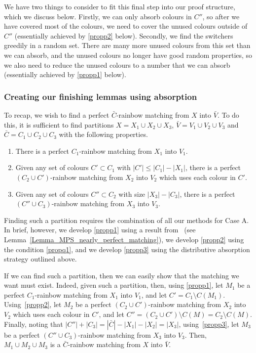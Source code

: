 We have two things to consider to fit this final step into our proof structure, which we discuss below. Firstly, we can only absorb colours in $C''$, so after we have covered most of the colours, we need to cover the unused colours outside of $C''$ (essentially achieved by \ref{propp2} below). Secondly, we find the switchers greedily in a random set. There are many more unused colours from this set than we can absorb, and the unused colours no longer have good random properties, so we also need to reduce the unused colours to a number that we can absorb (essentially achieved by \ref{propp1} below).


\subsubsection*{Creating our finishing lemmas using absorption}
To recap, we wish to find a perfect $\bar{C}$-rainbow matching from $X$ into $\bar{V}$. To do this, it is sufficient to find partitions $X=X_1\cup X_2\cup X_3$, $\bar{V}=V_1\cup V_2\cup V_3$ and $\bar{C}=C_1\cup C_2\cup C_3$ with the following properties.
\begin{enumerate}[label = {\bfseries \Alph{propcounter}\arabic{enumi}}]
\item There is a perfect $C_1$-rainbow matching from $X_1$ into $V_1$. \label{propp1}
\item Given any set of colours $C'\subset C_1$ with $|C'|\leq |C_1|-|X_1|$, there is a perfect $(C_2\cup C')$-rainbow matching from $X_2$ into $V_2$ which uses each colour in $C'$.\label{propp2}
\item Given any set of colours $C''\subset C_2$ with size $|X_3|-|C_3|$, there is a perfect  $(C''\cup C_3)$-rainbow matching from $X_3$ into $V_3$.\label{propp3}
\end{enumerate}
Finding such a partition requires the combination of all our methods for Case A. In brief, however, we develop \ref{propp1} using a result from~\cite{montgomery2018decompositions} (see Lemma~\ref{Lemma_MPS_nearly_perfect_matching}), we develop \ref{propp2} using the condition \ref{propq1}, and we develop \ref{propp3} using the distributive absorption strategy outlined above.

If we can find such a partition, then we can easily show that the matching we want must exist. Indeed, given such a partition, then, using \ref{propp1}, let $M_1$ be a perfect $C_1$-rainbow matching from $X_1$ into $V_1$, and let $C'=C_1\setminus C(M_1)$. Using~\ref{propp2}, let $M_2$ be a perfect  $(C_2\cup C')$-rainbow matching from $X_2$ into $V_2$ which uses each colour in $C'$, and let $C''=(C_2\cup C')\setminus C(M)=C_2\setminus C(M)$. Finally, noting that $|C''|+|C_3|=|\bar{C}|-|X_1|-|X_2|=|X_3|$, using~\ref{propp3}, let $M_3$ be a perfect $(C''\cup C_3)$-rainbow matching from $X_3$ into $V_3$. Then, $M_1\cup M_2\cup M_3$ is a $\bar{C}$-rainbow matching from $X$ into $\bar{V}$.



